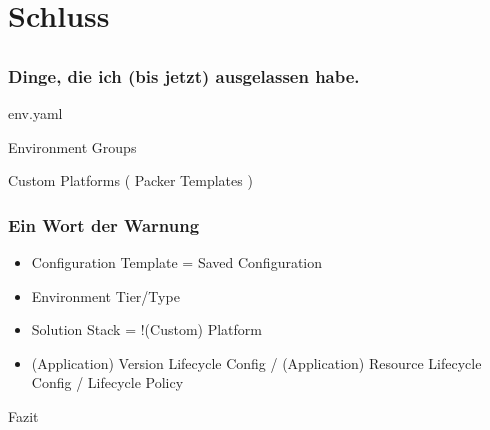 \documentclass[aspectratio=169,grey,smaller]{beamer}
\begin{document}
\section{Schluss}
\subsection{}

\begin{frame}
  \frametitle{Dinge, die ich (bis jetzt) ausgelassen habe.}
  \begin{LARGE}
  \begin{addmargin}[20mm]{0mm}
  env.yaml\pause
  
  \vspace{5mm}  
  
  Environment Groups\pause
    
  \vspace{5mm}  
  
  Custom Platforms \pause ( Packer Templates )
  \end{addmargin}
  \end{LARGE}
\end{frame}

\begin{frame}
  \frametitle{Ein Wort der Warnung}
  \begin{itemize}
  \item<3-> Configuration Template = Saved Configuration
  \item<4-> Environment Tier/Type
  \item<4-> Solution Stack = !(Custom) Platform
  \item<4-> (Application) Version Lifecycle Config / (Application) Resource Lifecycle Config / Lifecycle Policy
  \end{itemize}
  
  \vspace{8mm}
  
\end{frame}

\begin{frame}
  \begin{center}
  \Huge
  Fazit
  \end{center}
\end{frame}
\end{document}
